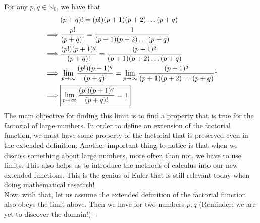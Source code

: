 For any $p,q\in\mathbb{N}_0$, we have that
\begin{align*}
	&(p+q)!=(p!)(p+1)(p+2)\dots(p+q)\\
	\implies&\frac{p!}{(p+q)!}=\frac{1}{(p+1)(p+2)\dots(p+q)}\\
	\implies&\frac{(p!)(p+1)^q}{(p+q)!}=\frac{(p+1)^q}{(p+1)(p+2)\dots(p+q)}\\
	\implies&\lim_{p\to\infty}\frac{(p!)(p+1)^q}{(p+q)!}=\lim_{p\to\infty}\frac{(p+1)^q}{(p+1)(p+2)\dots(p+q)}\footnotemark\\
	\implies&\boxed{\lim_{p\to\infty}\frac{(p!)(p+1)^q}{(p+q)!}=1}
\end{align*}
The main objective for finding this limit is to find a property that is true for the factorial of large numbers. In order to define an extension of the factorial function, we must have some property of the factorial that is preserved even in the extended definition. Another important thing to notice is that when we discuss something about large numbers, more often than not, we have to use limits. This also helps us to introduce the methods of calculus into our new extended functions. This is the genius of Euler that is still relevant today when doing mathematical research!\\
Now, with that, let us assume the extended definition of the factorial function also obeys the limit above. Then we have for two numbers $p,q$ (Reminder: we are yet to discover the domain!) -
